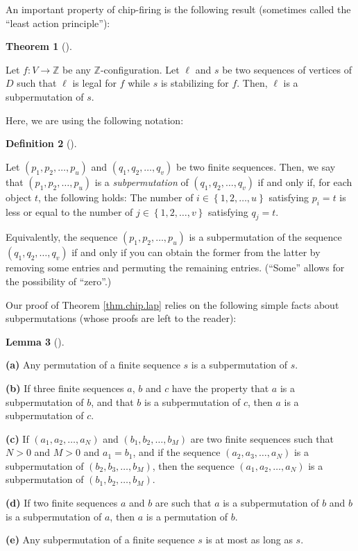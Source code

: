 \documentclass[numbers=enddot,12pt,final,onecolumn,notitlepage]{scrartcl}%
\theoremstyle{definition}
\newtheorem{theo}{Theorem}[section]
\newenvironment{theorem}[1][]
{\begin{theo}[#1]\begin{leftbar}}
{\end{leftbar}\end{theo}}
\newtheorem{lem}[theo]{Lemma}
\newenvironment{lemma}[1][]
{\begin{lem}[#1]\begin{leftbar}}
{\end{leftbar}\end{lem}}
\newtheorem{defi}[theo]{Definition}
\newenvironment{definition}[1][]
{\begin{defi}[#1]\begin{leftbar}}
{\end{leftbar}\end{defi}}
\newcommand{\ZZ}{\mathbb{Z}}
\newcommand{\set}[1]{\left\{ #1 \right\}}
\newcommand{\tup}[1]{\left( #1 \right)}
\begin{document}
An important property of chip-firing is the following result
(sometimes called the ``least action principle''):

\begin{theorem} \label{thm.chip.lap}
Let $f : V \to \ZZ$ be any $\ZZ$-configuration.
Let $\ell$ and $s$ be two sequences of vertices of $D$ such
that $\ell$ is legal for $f$ while $s$ is stabilizing for $f$.
Then, $\ell$ is a subpermutation of $s$.
\end{theorem}

Here, we are using the following notation:

\begin{definition}
Let $\tup{p_1, p_2, \ldots, p_u}$ and
$\tup{q_1, q_2, \ldots, q_v}$ be two finite sequences.
Then, we say that $\tup{p_1, p_2, \ldots, p_u}$ is
a \textit{subpermutation} of $\tup{q_1, q_2, \ldots, q_v}$
if and only if, for each object $t$, the following holds:
The number of $i \in \set{1, 2, \ldots, u}$ satisfying
$p_i = t$ is less or equal to the number of
$j \in \set{1, 2, \ldots, v}$ satisfying $q_j = t$.

Equivalently, the sequence $\tup{p_1, p_2, \ldots, p_u}$ is
a subpermutation of the sequence $\tup{q_1, q_2, \ldots, q_v}$
if and only if you can obtain the former from the latter by
removing some entries and permuting the remaining entries.
(``Some'' allows for the possibility of ``zero''.)
\end{definition}

Our proof of Theorem \ref{thm.chip.lap} relies on the following
simple facts about subpermutations (whose proofs are left
to the reader):

\begin{lemma} \label{lem.subper.simple-stuff}
\textbf{(a)} Any permutation of a finite sequence $s$ is a
subpermutation of $s$.

\textbf{(b)} If three finite sequences $a$, $b$ and $c$ have
the property that $a$ is a subpermutation of $b$, and that
$b$ is a subpermutation of $c$, then
$a$ is a subpermutation of $c$.

\textbf{(c)} If $\tup{a_1, a_2, \ldots, a_N}$
and $\tup{b_1, b_2, \ldots, b_M}$ are two finite sequences
such that $N > 0$ and $M > 0$ and $a_1 = b_1$,
and if the sequence $\tup{a_2, a_3, \ldots, a_N}$ is a
subpermutation of $\tup{b_2, b_3, \ldots, b_M}$, then
the sequence $\tup{a_1, a_2, \ldots, a_N}$ is a
subpermutation of $\tup{b_1, b_2, \ldots, b_M}$.

\textbf{(d)} If two finite sequences $a$ and $b$ are such
that $a$ is a subpermutation of $b$ and $b$ is a subpermutation
of $a$, then $a$ is a permutation of $b$.

\textbf{(e)} Any subpermutation of a finite sequence $s$ is
at most as long as $s$.
\end{lemma}
\end{document}
